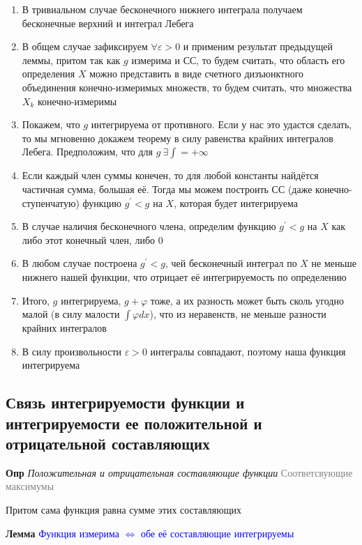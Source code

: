 \begin{enumerate}
    \item В тривиальном случае бесконечного нижнего интеграла получаем бесконечные верхний и интеграл Лебега
    \item В общем случае зафиксируем $\forall \varepsilon > 0$ и применим результат предыдущей леммы, притом так как $g$
    измерима и СС, то будем считать, что область его определения $X$ можно представить в виде счетного
    дизъюнктного объединения конечно-измеримых множеств, то будем считать, что множества $X_k$ конечно-измеримы
    \item Покажем, что $g$ интегрируема от противного.
    Если у нас это удастся сделать, то мы мгновенно докажем теорему в силу равенства крайних интегралов Лебега.
    Предположим, что для $g~\exists\int = +\infty $
    \item Если каждый член суммы конечен, то для любой константы найдётся частичная сумма, большая её.
    Тогда мы можем построить СС (даже конечно-ступенчатую) функцию $g^{'}< g$ на $X$, которая будет интегрируема
    \item В случае наличия бесконечного члена, определим функцию $g^{'}< g$ на $X$ как либо этот конечный член,
    либо 0
    \item В любом случае построена $g^{'}< g$, чей бесконечный интеграл по $X$ не меньше нижнего нашей функции,
    что отрицает её интегрируемость по определению
    \item Итого, $g$ интегрируема, $g + \varphi$ тоже, а их разность может быть сколь угодно малой (в силу малости
    $\int \varphi dx$), что из неравенств, не меньше разности крайних интегралов
    \item В силу произвольности $\varepsilon > 0$ интегралы совпадают, поэтому наша функция интегрируема
\end{enumerate}

\subsection{Связь интегрируемости функции и интегрируемости ее положительной и отрицательной составляющих}

\textbf{Опр} \textit{Положительная и отрицательная составляющие функции} \textcolor{gray}{Соответсвующие максимумы}

Притом сама функция равна сумме этих составляющих

\textbf{Лемма} \textcolor{blue}{Функция измерима $\Leftrightarrow$ обе её составляющие интегрируемы}

